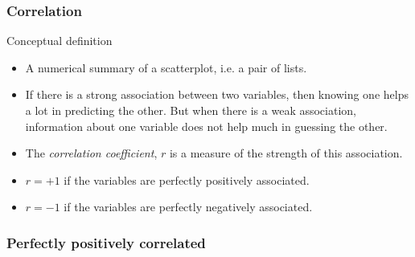 \documentclass[handout]{beamer}
\begin{document}

   \begin{frame} \frametitle{Correlation}

   \begin{block}
   {Conceptual definition}

   \begin{itemize}
   \item A numerical summary of a scatterplot, i.e. a pair of lists.

   \item    If there is a strong association between two variables, then
   knowing one helps a lot in predicting the other. But when
   there is a weak association, information about one variable
   does not help much in guessing the other.

   \item The {\em correlation coefficient}, $r$ is a measure of the strength of this association.

   \item $r=+1$ if the variables are perfectly positively associated.

   \item $r=-1$ if the variables are perfectly negatively associated.
   \end{itemize}



   \end{block}
   \end{frame}



   \begin{frame}
   \frametitle{Perfectly positively correlated}
   \begin{center}
   \end{center}

   \end{frame}

\end{document}
